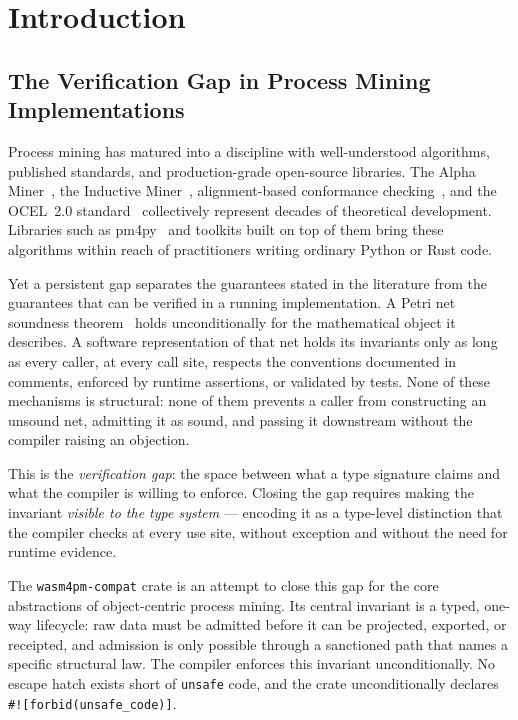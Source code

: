 \chapter{Introduction}
\label{ch:introduction}

\section{The Verification Gap in Process Mining Implementations}
\label{sec:intro-gap}

Process mining has matured into a discipline with well-understood algorithms,
published standards, and production-grade open-source libraries. The Alpha
Miner~\cite{vanderaalst2004workflow}, the Inductive
Miner~\cite{leemans2013discovering}, alignment-based conformance
checking~\cite{adriansyah2011conformance}, and the OCEL~2.0
standard~\cite{ocel20_2023} collectively represent decades of theoretical
development. Libraries such as pm4py~\cite{berti2019pm4py} and toolkits built
on top of them bring these algorithms within reach of practitioners writing
ordinary Python or Rust code.

Yet a persistent gap separates the guarantees stated in the literature from
the guarantees that can be verified in a running implementation. A Petri net
soundness theorem~\cite{vanderaalst1998application} holds unconditionally for
the mathematical object it describes. A software representation of that net
holds its invariants only as long as every caller, at every call site, respects
the conventions documented in comments, enforced by runtime assertions, or
validated by tests. None of these mechanisms is structural: none of them
prevents a caller from constructing an unsound net, admitting it as sound, and
passing it downstream without the compiler raising an objection.

This is the \emph{verification gap}: the space between what a type signature
claims and what the compiler is willing to enforce. Closing the gap requires
making the invariant \emph{visible to the type system} --- encoding it as a
type-level distinction that the compiler checks at every use site, without
exception and without the need for runtime evidence.

The \texttt{wasm4pm-compat} crate is an attempt to close this gap for the core
abstractions of object-centric process mining. Its central invariant is a
typed, one-way lifecycle: raw data must be admitted before it can be projected,
exported, or receipted, and admission is only possible through a sanctioned
path that names a specific structural law. The compiler enforces this invariant
unconditionally. No escape hatch exists short of \texttt{unsafe} code, and
the crate unconditionally declares \texttt{\#![forbid(unsafe\_code)]}.

